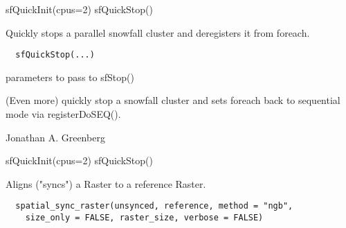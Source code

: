 \documentclass[a4paper]{book}
\begin{document}
%
\begin{Examples}
\begin{ExampleCode}
sfQuickInit(cpus=2)
sfQuickStop()
\end{ExampleCode}
\end{Examples}
%
\begin{Description}\relax
Quickly stops a parallel snowfall cluster and deregisters
it from foreach.
\end{Description}
%
\begin{Usage}
\begin{verbatim}
  sfQuickStop(...)
\end{verbatim}
\end{Usage}
%
\begin{Arguments}
\begin{ldescription}
\item[\code{...}] parameters to pass to sfStop()
\end{ldescription}
\end{Arguments}
%
\begin{Details}\relax
(Even more) quickly stop a snowfall cluster and sets
foreach back to sequential mode via registerDoSEQ().
\end{Details}
%
\begin{Author}\relax
Jonathan A. Greenberg
\end{Author}
%
\begin{SeeAlso}\relax
{}
\end{SeeAlso}
%
\begin{Examples}
\begin{ExampleCode}
sfQuickInit(cpus=2)
sfQuickStop()
\end{ExampleCode}
\end{Examples}
%
\begin{Description}\relax
Aligns ("syncs") a Raster to a reference Raster.
\end{Description}
%
\begin{Usage}
\begin{verbatim}
  spatial_sync_raster(unsynced, reference, method = "ngb",
    size_only = FALSE, raster_size, verbose = FALSE)
\end{verbatim}
\end{Usage}
%
\end{document}
